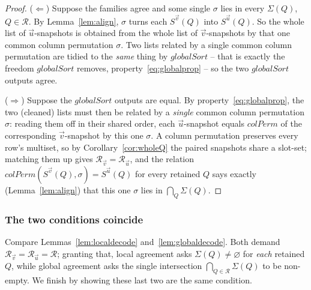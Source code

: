 \begin{proof}
($\Leftarrow$) Suppose the families agree and some single $\sigma$ lies in every
$\Sigma(Q)$, $Q\in\mathcal R$.  By Lemma~\ref{lem:align}, $\sigma$ turns each
$S^{\vec v}(Q)$ into $S^{\vec u}(Q)$.  So the whole list of $\vec u$-snapshots is
obtained from the whole list of $\vec v$-snapshots by that one common column
permutation $\sigma$.  Two lists related by a single common column permutation are
tidied to the \emph{same} thing by $globalSort$ -- that is exactly the freedom
$globalSort$ removes, property~\eqref{eq:globalprop} -- so the two $globalSort$
outputs agree.

($\Rightarrow$) Suppose the $globalSort$ outputs are equal.  By
property~\eqref{eq:globalprop}, the two (cleaned) lists must then be related by a
\emph{single} common column permutation $\sigma$: reading them off in their shared
order, each $\vec u$-snapshot equals $colPerm$ of the corresponding
$\vec v$-snapshot by this one $\sigma$.  A column permutation preserves every row's
multiset, so by
Corollary~\ref{cor:wholeQ} the paired snapshots share a slot-set; matching them up
gives $\mathcal R_{\vec v}=\mathcal R_{\vec u}$, and the relation
$colPerm(S^{\vec v}(Q),\sigma)=S^{\vec u}(Q)$ for every retained $Q$ says exactly
(Lemma~\ref{lem:align}) that this one $\sigma$ lies in $\bigcap_Q\Sigma(Q)$.
\end{proof}

\subsubsection*{The two conditions coincide}

Compare Lemmas~\ref{lem:localdecode} and~\ref{lem:globaldecode}.  Both demand
$\mathcal R_{\vec v}=\mathcal R_{\vec u}=\mathcal R$; granting that, local agreement
asks $\Sigma(Q)\neq\varnothing$ for \emph{each} retained $Q$, while global agreement
asks the single intersection $\bigcap_{Q\in\mathcal R}\Sigma(Q)$ to be non-empty.
We finish by showing these last two are the same condition.

